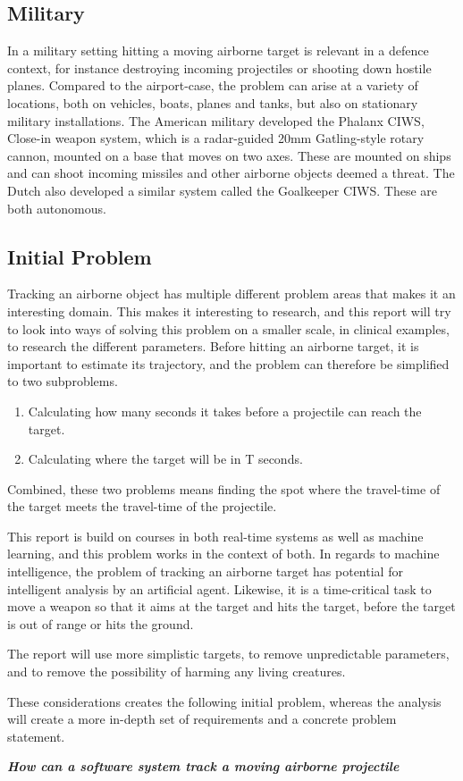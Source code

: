 \subsection{Military}
In a military setting hitting a moving airborne target is relevant in a defence context, for instance destroying incoming projectiles or shooting down hostile planes.
Compared to the airport-case, the problem can arise at a variety of locations, both on vehicles, boats, planes and tanks, but also on stationary military installations.
The American military developed the Phalanx CIWS, Close-in weapon system, which is a radar-guided 20mm Gatling-style rotary cannon, mounted on a base that moves on two axes\cite{PhalanxCIWS}.
These are mounted on ships and can shoot incoming missiles and other airborne objects deemed a threat.
The Dutch also developed a similar system called the Goalkeeper CIWS.
These are both autonomous.

\subsection{Initial Problem}

Tracking an airborne object has multiple different problem areas that makes it an interesting domain.
This makes it interesting to research, and this report will try to look into ways of solving this problem on a smaller scale, in clinical examples, to research the different parameters.
Before hitting an airborne target, it is important to estimate its trajectory, and the problem can therefore be simplified to two subproblems.
\begin{enumerate}
  \item Calculating how many seconds it takes before a projectile can reach the target.
  \item Calculating where the target will be in T seconds.
\end{enumerate}
Combined, these two problems means finding the spot where the travel-time of the target meets the travel-time of the projectile.

This report is build on courses in both real-time systems as well as machine learning, and this problem works in the context of both.
In regards to machine intelligence, the problem of tracking an airborne target has potential for intelligent analysis by an artificial agent.
Likewise, it is a time-critical task to move a weapon so that it aims at the target and hits the target, before the target is out of range or hits the ground.

The report will use more simplistic targets, to remove unpredictable parameters, and to remove the possibility of harming any living creatures.


These considerations creates the following initial problem, whereas the analysis will create a more in-depth set of requirements and a concrete problem statement.
\begin{center}
  \textit{\textbf{How can a software system track a moving airborne projectile}}
\end{center}
